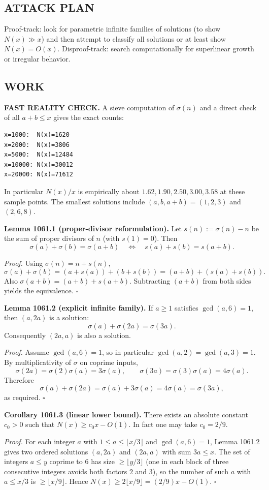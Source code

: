 \subsection*{ATTACK PLAN}
Proof-track: look for parametric infinite families of solutions (to show $N(x)\gg x$) and then attempt to classify all solutions or at least show $N(x)=O(x)$.
Disproof-track: search computationally for superlinear growth or irregular behavior.

\subsection*{WORK}
\textbf{FAST REALITY CHECK.}
A sieve computation of $\sigma(n)$ and a direct check of all $a+b\le x$ gives the exact counts:
\begin{verbatim}
x=1000:  N(x)=1620
x=2000:  N(x)=3806
x=5000:  N(x)=12484
x=10000: N(x)=30012
x=20000: N(x)=71612
\end{verbatim}
In particular $N(x)/x$ is empirically about $1.62,1.90,2.50,3.00,3.58$ at these sample points.
The smallest solutions include $(a,b,a+b)=(1,2,3)$ and $(2,6,8)$.

\medskip
\textbf{Lemma 1061.1 (proper-divisor reformulation).}
Let $s(n):=\sigma(n)-n$ be the sum of proper divisors of $n$ (with $s(1)=0$). Then
\[
\sigma(a)+\sigma(b)=\sigma(a+b)\quad\Longleftrightarrow\quad s(a)+s(b)=s(a+b).
\]

\emph{Proof.}
Using $\sigma(n)=n+s(n)$,
\[
\sigma(a)+\sigma(b)= (a+s(a))+(b+s(b)) = (a+b) + (s(a)+s(b)).
\]
Also $\sigma(a+b)=(a+b)+s(a+b)$. Subtracting $(a+b)$ from both sides yields the equivalence. \hfill$\square$

\medskip
\textbf{Lemma 1061.2 (explicit infinite family).}
If $a\ge 1$ satisfies $\gcd(a,6)=1$, then $(a,2a)$ is a solution:
\[
\sigma(a)+\sigma(2a)=\sigma(3a).
\]
Consequently $(2a,a)$ is also a solution.

\emph{Proof.}
Assume $\gcd(a,6)=1$, so in particular $\gcd(a,2)=\gcd(a,3)=1$. By multiplicativity of $\sigma$ on coprime inputs,
\[
\sigma(2a)=\sigma(2)\sigma(a)=3\sigma(a),\qquad \sigma(3a)=\sigma(3)\sigma(a)=4\sigma(a).
\]
Therefore
\[
\sigma(a)+\sigma(2a)=\sigma(a)+3\sigma(a)=4\sigma(a)=\sigma(3a),
\]
as required. \hfill$\square$

\medskip
\textbf{Corollary 1061.3 (linear lower bound).}
There exists an absolute constant $c_0>0$ such that $N(x)\ge c_0 x - O(1)$.
In fact one may take $c_0=2/9$.

\emph{Proof.}
For each integer $a$ with $1\le a\le \lfloor x/3\rfloor$ and $\gcd(a,6)=1$, Lemma 1061.2 gives two ordered solutions $(a,2a)$ and $(2a,a)$ with sum $3a\le x$.
The set of integers $a\le y$ coprime to $6$ has size $\ge \lfloor y/3\rfloor$ (one in each block of three consecutive integers avoids both factors $2$ and $3$), so the number of such $a$ with $a\le x/3$ is $\ge \lfloor x/9\rfloor$.
Hence $N(x)\ge 2\lfloor x/9\rfloor = (2/9)x - O(1)$. \hfill$\square$

